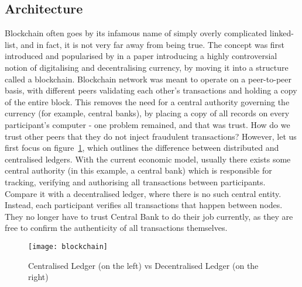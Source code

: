 \subsection{Architecture}
Blockchain often goes by its infamous name of simply overly complicated linked-list, and in fact, it is not very far away from being true. The concept was first introduced and popularised by \citet{nakamoto2008peer} in a paper introducing a highly controversial notion of digitalising and decentralising currency, by moving it into a structure called a blockchain. Blockchain network was meant to operate on a peer-to-peer basis, with different peers validating each other's transactions and holding a copy of the entire block. This removes the need for a central authority governing the currency (for example, central banks), by placing a copy of all records on every participant's computer - one problem remained, and that was trust. How do we trust other peers that they do not inject fraudulent transactions? However, let us first focus on figure~\ref{fig:blockchain}, which outlines the difference between distributed and centralised ledgers. With the current economic model, usually there exists some central authority (in this example, a central bank) which is responsible for tracking, verifying and authorising all transactions between participants. Compare it with a decentralised ledger, where there is no such central entity. Instead, each participant verifies all transactions that happen between nodes. They no longer have to trust Central Bank to do their job currently, as they are free to confirm the authenticity of all transactions themselves.

\begin{figure}[ht]
    \centering
    \texttt{[image: blockchain]}
    \caption{Centralised Ledger (on the left) vs Decentralised Ledger (on the right)}
    \label{fig:blockchain}
\end{figure}

